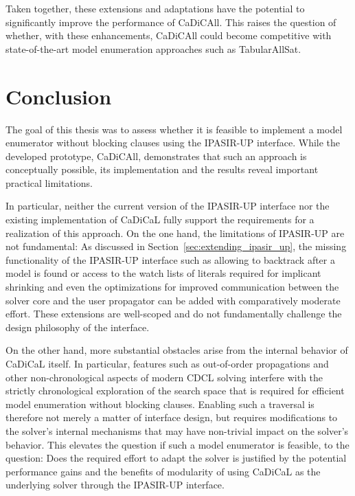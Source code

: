 \documentclass[12pt,a4paper]{article}
\begin{document}
Taken together, these extensions and adaptations have the potential to significantly improve the performance of CaDiCAll. This raises the question of whether, with these enhancements, CaDiCAll could become competitive with state-of-the-art model enumeration approaches such as TabularAllSat.

\newpage

\section{Conclusion}
The goal of this thesis was to assess whether it is feasible to implement a model enumerator without blocking clauses using the IPASIR-UP interface. While the developed prototype, CaDiCAll, demonstrates that such an approach is conceptually possible, its implementation and the results reveal important practical limitations.

In particular, neither the current version of the IPASIR-UP interface nor the existing implementation of CaDiCaL fully support the requirements for a realization of this approach. On the one hand, the limitations of IPASIR-UP are not fundamental: As discussed in Section~\ref{sec:extending_ipasir_up}, the missing functionality of the IPASIR-UP interface such as allowing to backtrack after a model is found or access to the watch lists of literals required for implicant shrinking and even the optimizations for improved communication between the solver core and the user propagator can be added with comparatively moderate effort. These extensions are well-scoped and do not fundamentally challenge the design philosophy of the interface.

On the other hand, more substantial obstacles arise from the internal behavior of CaDiCaL itself. In particular, features such as out-of-order propagations and other non-chronological aspects of modern CDCL solving interfere with the strictly chronological exploration of the search space that is required for efficient model enumeration without blocking clauses. Enabling such a traversal is therefore not merely a matter of interface design, but requires modifications to the solver's internal mechanisms that may have non-trivial impact on the solver's behavior. This elevates the question if such a model enumerator is feasible, to the question: Does the required effort to adapt the solver is justified by the potential performance gains and the benefits of modularity of using CaDiCaL as the underlying solver through the IPASIR-UP interface.
\end{document}
